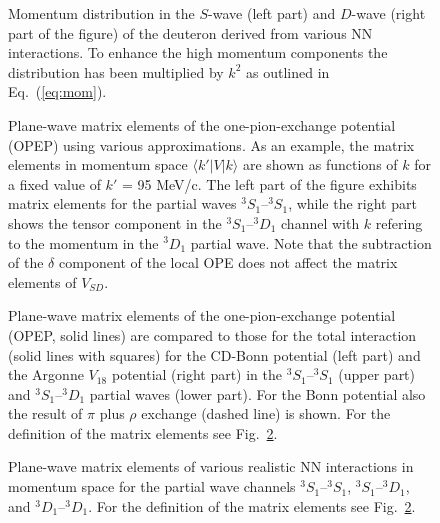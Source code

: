 \begin{figure}
\epsfysize=9.0cm
\begin{center}
\end{center}
\caption{Momentum distribution in the $S$-wave (left part) and $D$-wave (right 
part of the figure) of the deuteron derived from
various NN interactions. To enhance the high momentum components the
distribution has been multiplied by $k^2$ as outlined in
Eq.\ (\protect\ref{eq:mom}).}
\label{fig:wave}
\end{figure}
\vfil\eject
\begin{figure}
\epsfysize=9.0cm
\begin{center}
\end{center}
\caption{Plane-wave matrix elements of the one-pion-exchange potential 
(OPEP) using various
approximations. 
As an example, the matrix elements in momentum space 
$\langle k'\vert V\vert k\rangle$ 
are shown as functions of $k$ for a fixed value of $k'$ = 95 MeV/c.
The left part of the figure exhibits matrix elements for the partial waves
$^3S_1$--$^3S_1$, while the right part shows the tensor component in the
$^3S_1$--$^3D_1$ channel with $k$ refering 
to the momentum in the $^3D_1$ partial
wave. Note that the subtraction of the $\delta$ component of the local OPE does
not affect the matrix elements of $V_{SD}$.}
\label{fig:vpi}
\end{figure} 
\vfil\eject

\begin{figure}
\epsfysize=9.0cm
\begin{center}
\end{center}
\caption{Plane-wave matrix elements of the one-pion-exchange potential 
(OPEP, solid lines)
are compared to those for the total interaction (solid lines with squares) for
the CD-Bonn potential (left part) and the Argonne $V_{18}$ potential 
(right part)
in the $^3S_1$--$^3S_1$ (upper part) and $^3S_1$--$^3D_1$ 
partial waves (lower part). For the
Bonn potential also the result of $\pi$ plus $\rho$ exchange (dashed line) is
shown. For the definition of the matrix elements 
see Fig.\ \protect\ref{fig:vpi}.
}
\label{fig:pitov}
\end{figure}
\vfil\eject

\begin{figure}
\epsfysize=9.0cm
\begin{center}
\end{center}
\caption{Plane-wave matrix elements of various realistic NN 
interactions in momentum space
for the partial wave channels $^3S_1$--$^3S_1$, $^3S_1$--$^3D_1$, and 
$^3D_1$--$^3D_1$. For the definition of the matrix elements see Fig.\ 
\protect\ref{fig:vpi}.}
\label{fig:vcomp}
\end{figure}



